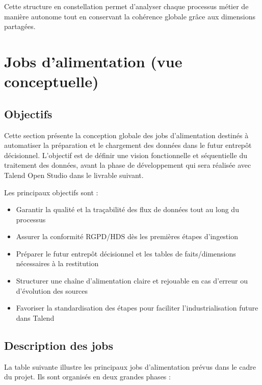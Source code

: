 \documentclass[12pt,a4paper]{article}
\begin{document}
Cette structure en constellation permet d'analyser chaque processus métier de manière autonome tout en conservant la cohérence globale grâce aux dimensions partagées.

\newpage
\section{Jobs d'alimentation (vue conceptuelle)}

\subsection{Objectifs}

Cette section présente la conception globale des jobs d'alimentation destinés à automatiser la préparation et le chargement des données dans le futur entrepôt décisionnel. L'objectif est de définir une vision fonctionnelle et séquentielle du traitement des données, avant la phase de développement qui sera réalisée avec Talend Open Studio dans le livrable suivant.

Les principaux objectifs sont :

\begin{itemize}[leftmargin=*]
    \item Garantir la qualité et la traçabilité des flux de données tout au long du processus
    \item Assurer la conformité RGPD/HDS dès les premières étapes d'ingestion
    \item Préparer le futur entrepôt décisionnel et les tables de faits/dimensions nécessaires à la restitution
    \item Structurer une chaîne d'alimentation claire et rejouable en cas d'erreur ou d'évolution des sources
    \item Favoriser la standardisation des étapes pour faciliter l'industrialisation future dans Talend
\end{itemize}

\subsection{Description des jobs}

La table suivante illustre les principaux jobs d'alimentation prévus dans le cadre du projet. Ils sont organisés en deux grandes phases :
\end{document}
